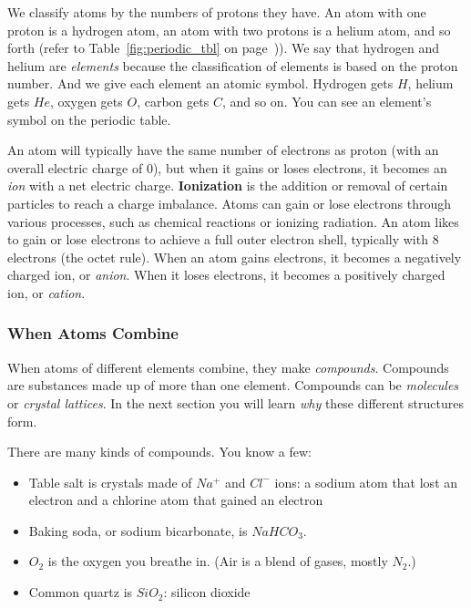 We classify atoms by the numbers of protons they have. An atom with one proton
is a hydrogen atom, an atom with two protons is a helium atom, and so forth
(refer to Table~\ref{fig:periodic_tbl} on page~\pageref{fig:periodic_tbl})). We say that hydrogen and helium are \textit{
elements} because the classification of elements is based on the proton number.
And we give each element an atomic symbol. Hydrogen gets $H$, helium gets $He$,
oxygen gets $O$, carbon gets $C$, and so on. You can see an element's 
symbol on the periodic table. 

An atom will typically have the same number of electrons as proton (with an overall electric charge of $0$), but when it gains or loses electrons, it becomes an \textit{ion} with a net electric charge. \textbf{Ionization} is the addition or removal of certain particles to reach a charge imbalance. Atoms can gain or lose electrons through various processes, such as chemical reactions or ionizing radiation. An atom likes to gain or lose electrons to achieve a full outer electron shell, typically with 8 electrons (the octet rule). When an atom gains electrons, it becomes a negatively charged ion, or \textit{anion}. When it loses electrons, it becomes a positively charged ion, 
or \textit{cation}. 

\subsubsection{When Atoms Combine}
When atoms of different elements combine, they make \textit{compounds}. Compounds
are substances made up of more than one element. Compounds can be 
\textit{molecules} or \textit{crystal lattices}. In the next section you will learn
\textit{why} these different structures form. 

There are many kinds of compounds. You know a few:
\begin{itemize}
\item Table salt is crystals made of $Na^{+}$ and $Cl^{-}$ ions: a sodium atom 
that lost an electron and a chlorine atom that gained an electron
\item Baking soda, or sodium bicarbonate, is $NaHCO_3$.
\item $O_2$ is the oxygen you breathe in. (Air is a blend of gases, mostly $N_2$.)
\item Common quartz is $SiO_2$: silicon dioxide
\end{itemize}

